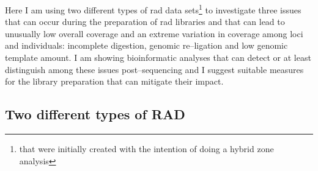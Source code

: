 \documentclass[a4paper,12pt,times,print,index,custombib,custommargin]{PhDThesisPSnPDF}\usepackage[]{graphicx}\usepackage[]{color}
\begin{document}
Here I am using two different types of \gls{rad} data sets\footnote{that were initially created with the intention of doing a hybrid zone analysis} to investigate three issues that can occur during the preparation of \gls{rad} libraries and that can lead to unusually low overall coverage and an extreme variation in coverage among loci and individuals: incomplete digestion, genomic re--ligation and low genomic template amount. I am showing bioinformatic analyses that can detect or at least distinguish among these issues post--sequencing and I suggest suitable measures for the library preparation that can mitigate their impact. 



\subsection{Two different types of RAD}

\end{document}
